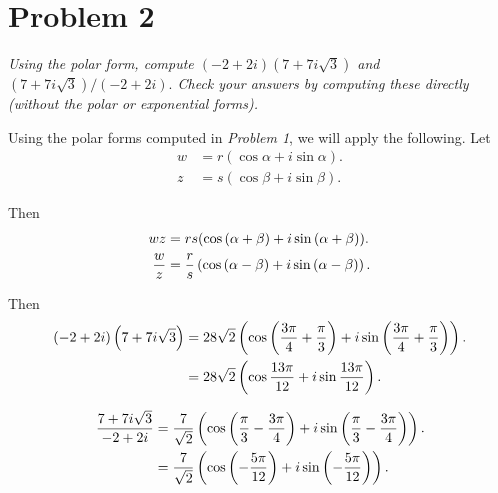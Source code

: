 \documentclass{tufte-handout}
\begin{document}
\section{Problem 2}

\begin{description}
\item \textit{Using the polar form, compute $(-2+2i)(7 + 7i\sqrt{3})$
    and $(7 + 7i\sqrt{3})/(-2 + 2i).$ Check your answers by computing
    these directly (without the polar or exponential forms).}
\end{description}

Using the polar forms computed in \textit{Problem 1}, we will apply
the following. Let
\begin{align*}
  w &= r(\cos \alpha + i \sin \alpha).\\
  z &= s(\cos \beta + i \sin \beta).
\end{align*}

Then
\begin{align*}
  wz &= rs(\cos{(\alpha + \beta)} + i \sin{(\alpha + \beta)}).\\
  {w \over z} &= {r \over s} \left( \cos{ (\alpha - \beta)} + i \sin{
                (\alpha - \beta)}\right).
\end{align*}

Then
\begin{align*}
  (-2 + 2i)\left(7 + 7i\sqrt 3\right) &= 28 \sqrt 2 \left( \cos{
                                        \left( {3 \pi \over 4} + {\pi
                                        \over 3}\right)} + i \sin{
                                        \left( {3 \pi \over 4} + {\pi
                                        \over 3}\right)}\right).\\
                                      &= 28 \sqrt 2 \left( \cos{ 13
                                        \pi \over 12} + i \sin{ 13 \pi
                                        \over 12}\right).
\end{align*}

\begin{align*}
  {7 + 7i \sqrt 3 \over -2 + 2i} &= {7 \over \sqrt 2} \left( \cos{
                                   \left( {\pi \over
                                   3} - {3 \pi \over 4} \right)} + i
                                   \sin{ \left( {\pi \over 3} - {3 \pi
                                   \over 4} \right) }\right).\\
                                 &= {7 \over \sqrt 2} \left(
                                   \cos{ \left( -{5 \pi \over 12}
                                   \right)} + i
                                   \sin{ \left( -{5 \pi \over 12}
                                   \right)} \right).\\
\end{align*}
\end{document}
